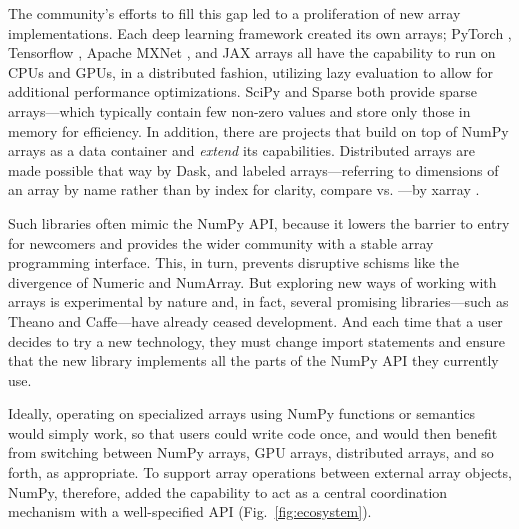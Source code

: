 The community's efforts to fill this gap led to a
proliferation of new array implementations. Each deep learning framework created
its own arrays; PyTorch \cite{NEURIPS2019_9015},
Tensorflow \cite{abadi2016tensorflow}, Apache MXNet \cite{chen2015mxnet},
and JAX arrays all have the
capability to run on CPUs and GPUs, in a distributed fashion, utilizing lazy evaluation
to allow for additional performance optimizations.  SciPy and Sparse both
provide sparse arrays---which typically contain few non-zero values and store
only those in memory for efficiency.
In addition, there are projects that build on top of NumPy arrays as a data
container and \textit{extend} its capabilities.  Distributed arrays are
made possible that way by Dask, and labeled arrays---referring to dimensions of
an array by name rather than by index for clarity, compare  vs.
---by xarray \cite{hoyer2017xarray}.

Such libraries often mimic the NumPy API, because it lowers the
barrier to entry for newcomers and provides the wider community with a
stable array programming interface. This, in turn, prevents disruptive
schisms like the divergence of Numeric and NumArray.
But exploring new ways of working with arrays is experimental by nature
and, in fact, several promising libraries---such as Theano and Caffe---have
already ceased development. And each time that a user
decides to try a new technology, they must
change import statements and ensure that the new library implements
all the parts of the NumPy API they currently use.




Ideally, operating on specialized arrays using NumPy functions or semantics would
simply work, so that users could write code once, and would then benefit
from switching between NumPy arrays, GPU arrays, distributed arrays,
and so forth, as appropriate.
To support array operations between external array objects, NumPy,
therefore, added the capability to act as a central coordination
mechanism with a well-specified API (Fig.~\ref{fig:ecosystem}).

